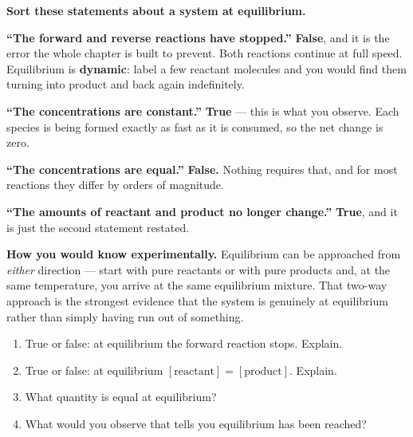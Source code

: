 \documentclass{apchem-worksheet}
\begin{document}
\begin{workedexample}
\textbf{Sort these statements about a system at equilibrium.}

\textbf{``The forward and reverse reactions have stopped.''}
\textbf{False}, and it is the error the whole chapter is built to
prevent. Both reactions continue at full speed. Equilibrium is
\textbf{dynamic}: label a few reactant molecules and you would find them
turning into product and back again indefinitely.

\textbf{``The concentrations are constant.''} \textbf{True} --- this is
what you observe. Each species is being formed exactly as fast as it is
consumed, so the net change is zero.

\textbf{``The concentrations are equal.''} \textbf{False.} Nothing
requires that, and for most reactions they differ by orders of
magnitude.

\textbf{``The amounts of reactant and product no longer change.''}
\textbf{True}, and it is just the second statement restated.

\textbf{How you would know experimentally.} Equilibrium can be
approached from \emph{either} direction --- start with pure reactants
or with pure products and, at the same temperature, you arrive at the
same equilibrium mixture. That two-way approach is the strongest
evidence that the system is genuinely at equilibrium rather than simply
having run out of something.
\end{workedexample}

\begin{yourturn}
\begin{enumerate}[leftmargin=*,itemsep=0.5em]
  \item True or false: at equilibrium the forward reaction stops.
        Explain. \workspace[1.6cm]
  \item True or false: at equilibrium $[\text{reactant}] =
        [\text{product}]$. Explain. \workspace[1.6cm]
  \item What quantity is equal at equilibrium? \workspace[1.4cm]
  \item What would you observe that tells you equilibrium has been
        reached? \workspace[1.6cm]
\end{enumerate}
\end{yourturn}
\end{document}

